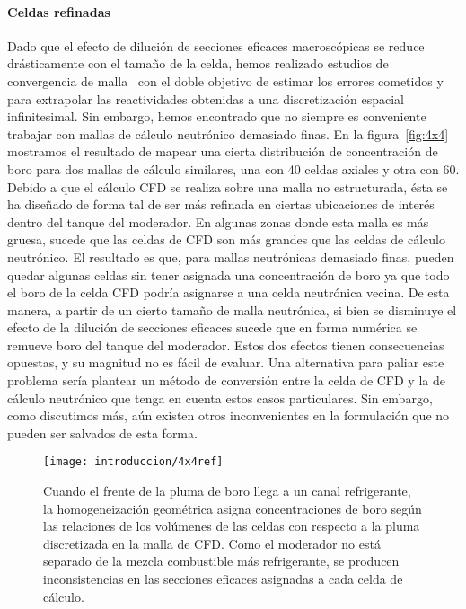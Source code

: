 \paragraph{Celdas refinadas}
Dado que el efecto de dilución de secciones eficaces macroscópicas se reduce drásticamente con el tamaño de la celda, hemos realizado estudios de convergencia de malla~\cite{aatn-aet-2014} con el doble objetivo de estimar los errores cometidos y para extrapolar las reactividades obtenidas a una discretización espacial infinitesimal. Sin embargo, hemos encontrado que no siempre es conveniente trabajar con mallas de cálculo neutrónico demasiado finas. En la figura~\ref{fig:4x4} mostramos el resultado de mapear una cierta distribución de concentración de boro para dos mallas de cálculo similares, una con 40 celdas axiales y otra con 60. Debido a que el cálculo CFD se realiza sobre una malla no estructurada, ésta se ha diseñado de forma tal de ser más refinada en ciertas ubicaciones de interés dentro del tanque del moderador. En algunas zonas donde esta malla es más gruesa, sucede que las celdas de CFD son más grandes que las celdas de cálculo neutrónico. El resultado es que, para mallas neutrónicas demasiado 
finas, pueden quedar algunas celdas sin tener asignada una concentración de boro ya que todo el boro de la celda CFD podría asignarse a una celda neutrónica vecina. De esta manera, a partir de un cierto tamaño de malla neutrónica, si bien se disminuye el efecto de la dilución de secciones eficaces sucede que en forma numérica se remueve boro del tanque del moderador. Estos dos efectos tienen consecuencias opuestas, y su magnitud no es fácil de evaluar. Una alternativa para paliar este problema sería plantear un método de conversión entre la celda de CFD y la de cálculo neutrónico que tenga en cuenta estos casos particulares. Sin embargo, como discutimos más, aún existen otros inconvenientes en la formulación que no pueden ser salvados de esta forma.

\begin{figure}
 \begin{center}
  \texttt{[image: introduccion/4x4ref]}
 \end{center}
\caption{\label{fig:4x4ref}Cuando el frente de la pluma de boro llega a un canal refrigerante, la homogeneización geométrica asigna concentraciones de boro según las relaciones de los volúmenes de las celdas con respecto a la pluma discretizada en la malla de CFD. Como el moderador no está separado de la mezcla combustible más refrigerante, se producen inconsistencias en las secciones eficaces asignadas a cada celda de cálculo.}
\end{figure}



